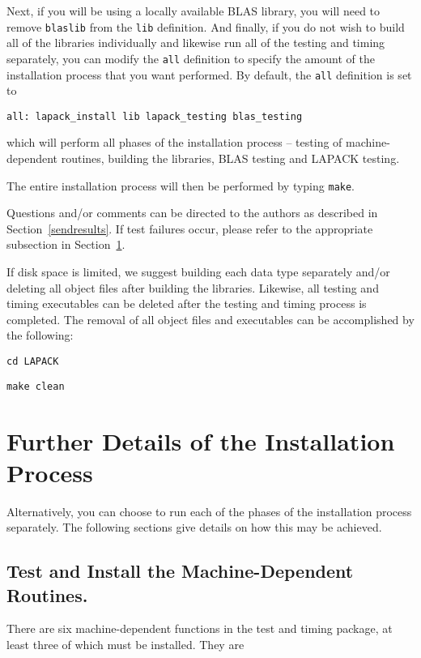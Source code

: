 \documentclass[11pt]{report}
\begin{document}
Next, if you will be using a locally available BLAS library, you will need
to remove \texttt{blaslib} from the \texttt{lib} definition.  And finally,
if you do not wish to build all of the libraries individually and
likewise run all of the testing and timing separately, you can
modify the \texttt{all} definition to specify the amount of the
installation process that you want performed.  By default,
the \texttt{all} definition is set to
\begin{verbatim}
all: lapack_install lib lapack_testing blas_testing
\end{verbatim}
which will perform all phases of the installation
process -- testing of machine-dependent routines, building the libraries,
BLAS testing and LAPACK testing.

The entire installation process will then be performed by typing
\texttt{make}.

Questions and/or comments can be directed to the
authors as described in Section~\ref{sendresults}.  If test failures
occur, please refer to the appropriate subsection in
Section~\ref{furtherdetails}.

If disk space is limited, we suggest building each data type separately
and/or deleting all object files after building the libraries.  Likewise, all
testing and timing executables can be deleted after the testing and timing
process is completed.  The removal of all object files and executables
can be accomplished by the following:

\begin{list}{}{}
\item \texttt{cd LAPACK}
\item \texttt{make clean}
\end{list}

\section{Further Details of the Installation Process}\label{furtherdetails}

Alternatively, you can choose to run each of the phases of the
installation process separately.  The following sections give details
on how this may be achieved.

\subsection{Test and Install the Machine-Dependent Routines.}

There are six machine-dependent functions in the test and timing
package, at least three of which must be installed.  They are
\end{document}
